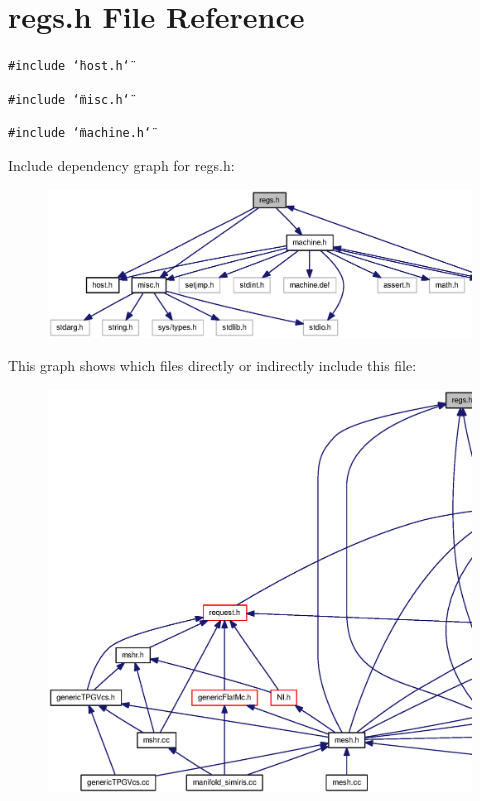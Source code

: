 \section{regs.h File Reference}
\label{regs_8h}
{\tt \#include \char`\"{}host.h\char`\"{}}\par
{\tt \#include \char`\"{}misc.h\char`\"{}}\par
{\tt \#include \char`\"{}machine.h\char`\"{}}\par


Include dependency graph for regs.h:\nopagebreak
\begin{figure}[H]
\begin{center}
\leavevmode
\includegraphics[width=343pt]{regs_8h__incl}
\end{center}
\end{figure}


This graph shows which files directly or indirectly include this file:\nopagebreak
\begin{figure}[H]
\begin{center}
\leavevmode
\includegraphics[width=420pt]{regs_8h__dep__incl}
\end{center}
\end{figure}
